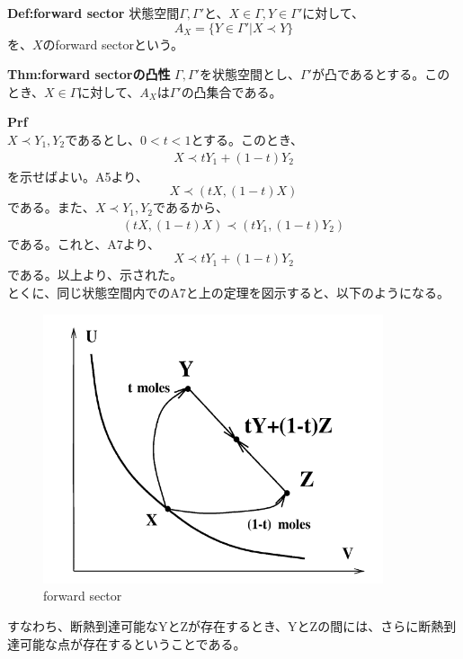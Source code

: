 \documentclass[a4paper,11pt]{jsarticle}
\begin{document}
\begin{itembox}[l]{\textbf{Def:forward sector}}
    状態空間$\Gamma,\Gamma'$と、$X \in \Gamma,Y \in \Gamma'$に対して、
    \begin{equation}
        A_X = \{Y \in \Gamma'|X \prec Y\}
    \end{equation}
    を、$X$のforward sectorという。
\end{itembox}
\begin{itembox}[l]{\textbf{Thm:forward sectorの凸性}}
    $\Gamma,\Gamma'$を状態空間とし、$\Gamma '$が凸であるとする。このとき、$X \in \Gamma$に対して、$A_X$は$\Gamma'$の凸集合である。
\end{itembox}
\textbf{Prf}\\
$X \prec Y_1,Y_2$であるとし、$0 < t < 1$とする。このとき、
\begin{align}
    X \prec tY_1+(1-t)Y_2
\end{align}
を示せばよい。A5より、
\begin{equation}
    X \prec (tX,(1-t)X)
\end{equation}
である。また、$X \prec Y_1,Y_2$であるから、
\begin{align}
    (tX,(1-t)X) \prec (tY_1,(1-t)Y_2)
\end{align}
である。これと、A7より、
\begin{equation}
    X \prec tY_1+(1-t)Y_2
\end{equation}
である。以上より、示された。\hfill\qedsymbol\\
とくに、同じ状態空間内でのA7と上の定理を図示すると、以下のようになる。\\
\begin{figure}[H]
    \begin{center}
    \includegraphics[width=100mm]{fig3.png}
    \end{center}
    \caption{forward sector}
    \label{fig:two}
\end{figure}
すなわち、断熱到達可能なYとZが存在するとき、YとZの間には、さらに断熱到達可能な点が存在するということである。\\
\end{document}
